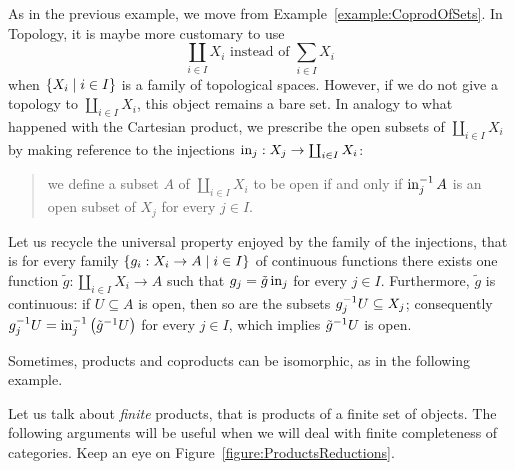 \begin{example}
As in the previous example, we move from Example~\ref{example:CoprodOfSets}. In Topology, it is maybe more customary to use
\[\coprod_{i \in I} X_i \text{ instead of } \sum_{i \in I} X_i\]
when \(\left\{X_i \mid i \in I\right\}\) is a family of topological spaces. However, if we do not give a topology to \(\coprod_{i \in I} X_i\), this object remains a bare set. In analogy to what happened with the Cartesian product, we prescribe the open subsets of \(\coprod_{i \in I} X_i\) by making reference to the injections \(\operatorname{in}_j : X_j \to \coprod_{i \in I} X_i\):
\begin{quotation}
we define a subset \(A\) of \(\coprod_{i \in I} X_i\) to be open if and only if \(\operatorname{in}_j^{-1} A\) is an open subset of \(X_j\) for every \(j \in I\).
\end{quotation}
Let us recycle the universal property enjoyed by the family of the injections, that is for every family \(\left\{g_i : X_i \to A \mid i \in I\right\}\) of continuous functions there exists one function \(\tilde g : \coprod_{i \in I} X_i \to A\) such that \(g_j = \tilde g \operatorname{in}_j\) for every \(j \in I\). Furthermore, \(\tilde g\) is continuous: if \(U \subseteq A\) is open, then so are the subsets \(g_j^{-1} U \subseteq X_j\); consequently \(g_j^{-1} U = \operatorname{in}_j^{-1} \left(\tilde g^{-1} U\right)\) for every \(j \in I\), which implies \(\tilde g^{-1} U\) is open.
\end{example}

Sometimes, products and coproducts can be isomorphic, as in the following example.

\begin{example}
\end{example}

Let us talk about {\em finite} products, that is products of a finite set of
objects. The following arguments will be useful when we will deal with finite completeness of categories. Keep an eye on Figure~\ref{figure:ProductsReductions}.

